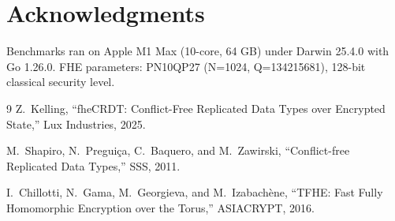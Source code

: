 \documentclass{fhe-shared/luxfhe}
\begin{document}
\section*{Acknowledgments}

Benchmarks ran on Apple M1 Max (10-core, 64 GB) under Darwin 25.4.0
with Go 1.26.0.  FHE parameters: PN10QP27 (N=1024, Q=134215681),
128-bit classical security level.

\begin{thebibliography}{9}
Z.~Kelling, ``fheCRDT: Conflict-Free Replicated Data Types over
Encrypted State,'' Lux Industries, 2025.

M.~Shapiro, N.~Pregui\c{c}a, C.~Baquero, and M.~Zawirski,
``Conflict-free Replicated Data Types,'' SSS, 2011.

I.~Chillotti, N.~Gama, M.~Georgieva, and M.~Izabach\`ene,
``TFHE: Fast Fully Homomorphic Encryption over the Torus,''
ASIACRYPT, 2016.
\end{thebibliography}
\end{document}
